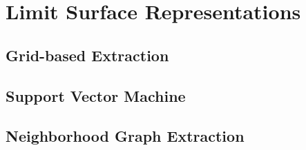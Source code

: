 \section{Limit Surface Representations}
\subsection{Grid-based Extraction}

\subsection{Support Vector Machine}

\subsection{Neighborhood Graph Extraction}